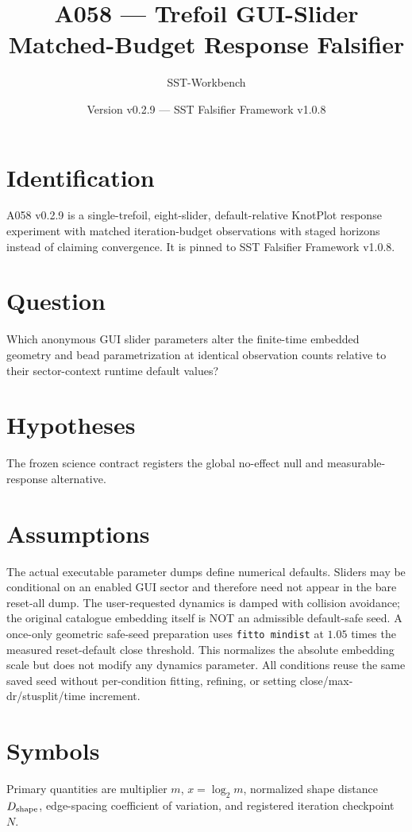 \documentclass[11pt,a4paper]{article}
\begin{document}
\title{A058 --- Trefoil GUI-Slider Matched-Budget Response Falsifier}
\author{SST-Workbench}\date{Version v0.2.9 --- SST Falsifier Framework v1.0.8}\maketitle
{}
\section{Identification}
A058 v0.2.9 is a single-trefoil, eight-slider, default-relative KnotPlot response experiment with matched iteration-budget observations with staged horizons instead of claiming convergence. It is pinned to SST Falsifier Framework v1.0.8.
\section{Question}
Which anonymous GUI slider parameters alter the finite-time embedded geometry and bead parametrization at identical observation counts relative to their sector-context runtime default values?
\section{Hypotheses}
The frozen science contract registers the global no-effect null and measurable-response alternative.
\section{Assumptions}
The actual executable parameter dumps define numerical defaults. Sliders may be conditional on an enabled GUI sector and therefore need not appear in the bare reset-all dump. The user-requested dynamics is damped with collision avoidance; the original catalogue embedding itself is NOT an admissible default-safe seed. A once-only geometric safe-seed preparation uses \texttt{fitto mindist} at $1.05$ times the measured reset-default close threshold. This normalizes the absolute embedding scale but does not modify any dynamics parameter. All conditions reuse the same saved seed without per-condition fitting, refining, or setting close/max-dr/stusplit/time increment.
\section{Symbols}
Primary quantities are multiplier $m$, $x=\log_2m$, normalized shape distance $D_{\rm shape}$, edge-spacing coefficient of variation, and registered iteration checkpoint $N$.
\end{document}
